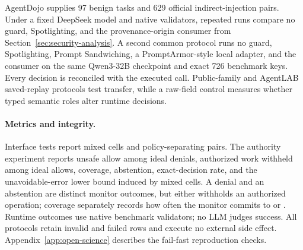 AgentDojo supplies 97 benign tasks and 629 official indirect-injection pairs.
Under a fixed DeepSeek model and native validators, repeated runs compare no
guard, Spotlighting, and the provenance-origin consumer from
Section~\ref{sec:security-analysis}. A second common protocol runs no guard,
Spotlighting, Prompt Sandwiching, a PromptArmor-style local adapter, and the
consumer on the same Qwen3-32B checkpoint and exact 726 benchmark keys. Every
decision is reconciled with the executed call. Public-family and AgentLAB
saved-replay protocols test transfer, while a raw-field control measures
whether typed semantic roles alter runtime decisions.

\paragraph{Metrics and integrity.}
Interface tests report mixed cells and policy-separating pairs. The authority
experiment reports unsafe allow among ideal denials, authorized work withheld
among ideal allows, coverage, abstention, exact-decision rate, and the
unavoidable-error lower bound induced by mixed cells. A denial and an
abstention are distinct monitor outcomes, but either withholds an authorized
operation; coverage separately records how often the monitor commits to
\Allow{} or \Deny{}. Runtime outcomes use native benchmark validators; no LLM
judges success. All protocols retain invalid and failed rows and execute no
external side effect. Appendix~\ref{app:open-science} describes the fail-fast
reproduction checks.
